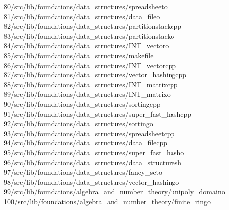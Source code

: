 \begin{tabbing}
80\>/src/lib/foundations/data\_structures/spreadsheeto\\[0pt]
81\>/src/lib/foundations/data\_structures/data\_fileo\\[0pt]
82\>/src/lib/foundations/data\_structures/partitionstackcpp\\[0pt]
83\>/src/lib/foundations/data\_structures/partitionstacko\\[0pt]
84\>/src/lib/foundations/data\_structures/INT\_vectoro\\[0pt]
85\>/src/lib/foundations/data\_structures/makefile\\[0pt]
86\>/src/lib/foundations/data\_structures/INT\_vectorcpp\\[0pt]
87\>/src/lib/foundations/data\_structures/vector\_hashingcpp\\[0pt]
88\>/src/lib/foundations/data\_structures/INT\_matrixcpp\\[0pt]
89\>/src/lib/foundations/data\_structures/INT\_matrixo\\[0pt]
90\>/src/lib/foundations/data\_structures/sortingcpp\\[0pt]
91\>/src/lib/foundations/data\_structures/super\_fast\_hashcpp\\[0pt]
92\>/src/lib/foundations/data\_structures/sortingo\\[0pt]
93\>/src/lib/foundations/data\_structures/spreadsheetcpp\\[0pt]
94\>/src/lib/foundations/data\_structures/data\_filecpp\\[0pt]
95\>/src/lib/foundations/data\_structures/super\_fast\_hasho\\[0pt]
96\>/src/lib/foundations/data\_structures/data\_structuresh\\[0pt]
97\>/src/lib/foundations/data\_structures/fancy\_seto\\[0pt]
98\>/src/lib/foundations/data\_structures/vector\_hashingo\\[0pt]
99\>/src/lib/foundations/algebra\_and\_number\_theory/unipoly\_domaino\\[0pt]
100\>/src/lib/foundations/algebra\_and\_number\_theory/finite\_ringo\\[0pt]

\end{tabbing}
